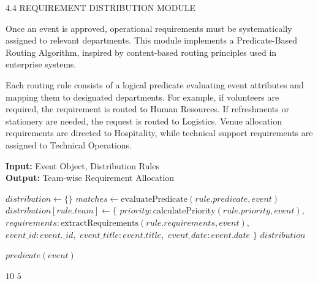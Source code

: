 4.4 REQUIREMENT DISTRIBUTION MODULE

Once an event is approved, operational requirements must be systematically assigned to relevant departments. This module implements a Predicate-Based Routing Algorithm, inspired by content-based routing principles used in enterprise systems.

Each routing rule consists of a logical predicate evaluating event attributes and mapping them to designated departments. For example, if volunteers are required, the requirement is routed to Human Resources. If refreshments or stationery are needed, the request is routed to Logistics. Venue allocation requirements are directed to Hospitality, while technical support requirements are assigned to Technical Operations.

\begin{algorithm}[H]
\caption{Predicate-Based Requirement Distribution}
\label{alg:requirement_distribution}
\textbf{Input:} Event Object, Distribution Rules\\
\textbf{Output:} Team-wise Requirement Allocation
\begin{algorithmic}[1]
    \State $distribution \gets \{\}$
        \State $matches \gets \text{evaluatePredicate}(rule.predicate, event)$
            \State $distribution[rule.team] \gets \{$
            \State \hspace{1em} $priority: \text{calculatePriority}(rule.priority, event),$
            \State \hspace{1em} $requirements: \text{extractRequirements}(rule.requirements, event),$
            \State \hspace{1em} $event\_id: event.\_id,$
            \State \hspace{1em} $event\_title: event.title,$
            \State \hspace{1em} $event\_date: event.date$
            \State $\}$
        \EndIf
    \EndFor
    \State \Return $distribution$
\EndFunction

    \State \Return $predicate(event)$
\EndFunction

        \State \Return $10$
    \Else
        \State \Return $5$
    \EndIf
\EndFunction
\end{algorithmic}
\end{algorithm}

